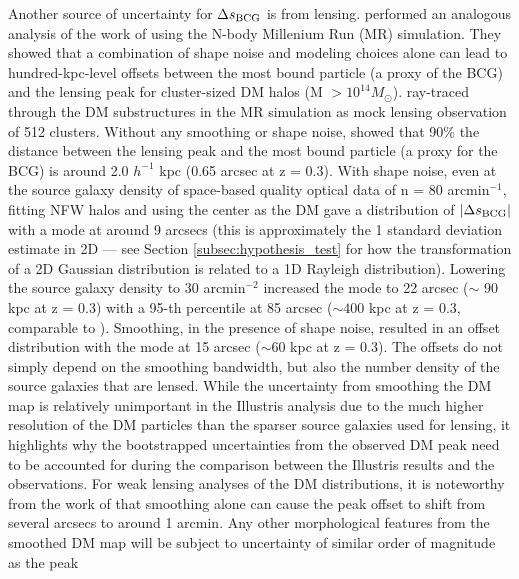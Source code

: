 Another source of uncertainty for $\Delta s_{\rm BCG}$ is from lensing. 
\cite{Dietrich2012} performed an analogous analysis of the work of \cite{Oguri2010} 
using the N-body Millenium Run (MR) simulation.
They showed that a combination of shape noise and modeling choices 
alone can lead to hundred-kpc-level offsets between the most bound particle 
(a proxy of the BCG) and the lensing peak for cluster-sized DM halos 
(M $> 10^{14 }M_\odot$).  
\cite{Dietrich2012} ray-traced through the DM substructures in the MR simulation 
as mock lensing observation of 512 clusters.  
Without any smoothing or shape noise, \cite{Dietrich2012} showed 
that 90\% the distance between the lensing peak and the 
most bound particle (a proxy for the BCG) is around 2.0 $h^{-1}$ kpc
(0.65 arcsec at z = 0.3). 
With shape noise,
even at the source galaxy density of space-based quality optical data of n = 80
arcmin$^{-1}$, fitting NFW halos and using the center as the DM gave a 
distribution of $|\Delta s_{\rm BCG}|$ with a mode at around 9 arcsecs (this is
approximately the 1 standard deviation estimate in 2D --- see Section
\ref{subsec:hypothesis_test} for how the transformation of a 2D Gaussian
distribution is related to a 1D Rayleigh distribution). 
Lowering the source galaxy density to 30 arcmin$^{-2}$ increased the mode
to 22 arcsec ($\sim$ 90 kpc at z = 0.3) with a 95-th percentile at 85 arcsec 
($\sim 400$ kpc at z = 0.3, comparable to \citealt{Oguri2010}). 
Smoothing, in the presence of shape noise,
resulted in an offset distribution with the mode at
15 arcsec ($\sim 60$ kpc at z = 0.3). 
The offsets do not simply depend on the smoothing bandwidth, 
but also the number density of the source galaxies that are lensed. 
While the uncertainty from smoothing the DM map is
relatively unimportant in the Illustris analysis due to the much higher resolution 
of the DM particles than the sparser source galaxies used for lensing, it
highlights why the bootstrapped uncertainties from the observed
DM peak need to be accounted for during the comparison between the
Illustris results and the observations.
For weak lensing analyses of the DM distributions,
it is noteworthy from the work of \cite{Dietrich2012} that 
smoothing alone can cause the peak offset to shift from several arcsecs to
around 1 arcmin.
Any other morphological features from the smoothed DM map will be subject 
to uncertainty of similar order of magnitude as the peak

